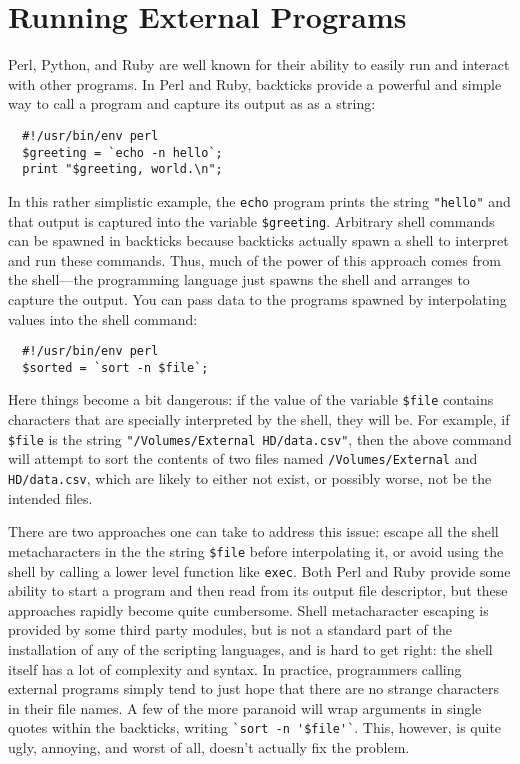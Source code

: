\documentclass{article}
\begin{document}
\section{Running External Programs}

Perl, Python, and Ruby are well known for their ability to easily run and interact with other programs.
In Perl and Ruby, backticks provide a powerful and simple way to call a program and capture its output as as a string:
\begin{verbatim}
  #!/usr/bin/env perl
  $greeting = `echo -n hello`;
  print "$greeting, world.\n";
\end{verbatim}
In this rather simplistic example, the \verb|echo| program prints the string \verb|"hello"| and that output is captured into the variable \verb|$greeting|.
Arbitrary shell commands can be spawned in backticks because backticks actually spawn a shell to interpret and run these commands.
Thus, much of the power of this approach comes from the shell---the programming language just spawns the shell and arranges to capture the output.
You can pass data to the programs spawned by interpolating values into the shell command:
\begin{verbatim}
  #!/usr/bin/env perl
  $sorted = `sort -n $file`;
\end{verbatim}
Here things become a bit dangerous:
if the value of the variable \verb|$file| contains characters that are specially interpreted by the shell, they will be.
For example, if \verb|$file| is the string \verb|"/Volumes/External HD/data.csv"|, then the above command will attempt to sort the contents of two files named \verb|/Volumes/External| and \verb|HD/data.csv|, which are likely to either not exist, or possibly worse, not be the intended files.

There are two approaches one can take to address this issue: escape all the shell metacharacters in the the string \verb|$file| before interpolating it, or avoid using the shell by calling a lower level function like \verb|exec|.
Both Perl and Ruby provide some ability to start a program and then read from its output file descriptor, but these approaches rapidly become quite cumbersome.
Shell metacharacter escaping is provided by some third party modules, but is not a standard part of the installation of any of the scripting languages, and is hard to get right:
the shell itself has a lot of complexity and syntax.
In practice, programmers calling external programs simply tend to just hope that there are no strange characters in their file names.
A few of the more paranoid will wrap arguments in single quotes within the backticks, writing \verb|`sort -n '$file'`|.
This, however, is quite ugly, annoying, and worst of all, doesn't actually fix the problem.
\end{document}
